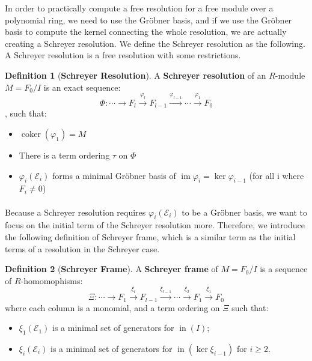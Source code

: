\documentclass{article}
\newcommand{\im}{\ensuremath{\operatorname{im}}}
\newcommand{\coker}{\ensuremath{\operatorname{coker}}}
\newcommand{\initTerm}{\ensuremath{\operatorname{in}}}
\renewcommand{\to}{\ensuremath{\rightarrow}}
\theoremstyle{definition}
\newtheorem{definition}{Definition}[section]
\theoremstyle{remark}
\theoremstyle{example}
\begin{document}
In order to practically compute a free resolution for a free module over a polynomial ring, we need to use the Gröbner basis, and if we use the Gröbner basis to compute the kernel connecting the whole resolution, we are actually creating a Schreyer resolution. We define the Schreyer resolution as the following. A Schreyer resolution is a free resolution with some restrictions.

\begin{definition}[\textbf{Schreyer Resolution}]
    A \textbf{Schreyer resolution} of an $R$-module $M = F_0/I$ is an exact sequence:
    \begin{equation}
        \Phi: \cdots \rightarrow F_l \xrightarrow{\varphi_l} F_{l-1} \xrightarrow{\varphi_{l-1}} \cdots \xrightarrow{\varphi_1} F_0
    \end{equation}
    , such that:
    \begin{itemize}
        \item $\coker(\varphi_1) = M$
        \item There is a term ordering $\tau$ on $\Phi$
        \item $\varphi_i(\mathcal{E}_i)$ forms a minimal Gröbner basis of $\im \varphi_i = \ker \varphi_{i-1}$ (for all i where $F_i \neq 0$)
    \end{itemize}
\end{definition}

\paragraph{}

Because a Schreyer resolution requires $\varphi_i(\mathcal{E}_i)$ to be a Gröbner basis, we want to focus on the initial term of the Schreyer resolution more. Therefore, we introduce the following definition of Schreyer frame, which is a similar term as the initial terms of a resolution in the Schreyer case.

\begin{definition}[\textbf{Schreyer Frame}]
    A \textbf{Schreyer frame} of $M = F_0/I$ is a sequence of $R$-homomophisms:
    \begin{equation}
        \Xi: \cdots \to F_1 \xrightarrow{\xi_l} F_{l-1} \xrightarrow{\xi_{l-1}} \cdots \xrightarrow{\xi_2} F_1 \xrightarrow{\xi_1} F_0
    \end{equation}
    where each column is a monomial, and a term ordering on $\Xi$ such that:
    \begin{itemize}
        \item $\xi_1(\mathcal{E}_1)$ is a minimal set of generators for $\initTerm(I)$;
        \item $\xi_i(\mathcal{E}_i)$ is a minimal set of generators for $\initTerm(\ker \xi_{i-1})$ for $i \geq 2$.
    \end{itemize}
\end{definition}
\end{document}
